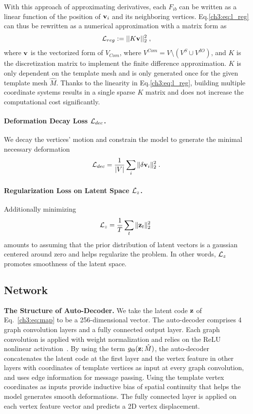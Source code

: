 With this approach of approximating derivatives, each $F_{ib}$ can be written as a linear function of the position of $\mathbf{v}_i$ and its neighboring vertices. Eq.\ref{ch3:eq:l_reg} can thus be rewritten as a numerical approximation with a matrix form as
\begin{equation}
    \mathcal{L}_{reg} := ||K\mathbf{v}||_2^2\;,
    \label{ch3:eq:discrete_euler_lagrange}
\end{equation}
where $\mathbf{v}$ is the vectorized form of $V_{Com}$, where $V^{Com}=V \setminus  ({V^S \cup V^{IO}})$, and $K$ is the discretization matrix to implement the finite difference approximation.
$K$ is only dependent on the template mesh and is only generated once for the given template mesh $\hat{M}$.
Thanks to the linearity in Eq.\ref{ch3:eq:l_reg}, building multiple coordinate systems results in a single sparse $K$ matrix and does not increase the computational cost significantly.

\paragraph{Deformation Decay Loss $\mathcal{L}_{dec}$.} 

We decay the vertices' motion and constrain the model to generate the minimal necessary deformation
%
\begin{equation}
    \mathcal{L}_{dec} = \frac{1}{|V|} \sum_i \| \mathbf{\delta v}_i \|^2_2\;.
\end{equation}

\paragraph{Regularization Loss on Latent Space $\mathcal{L}_z$.} Additionally minimizing 
%
\begin{equation}
    \mathcal{L}_{z} = \frac{1}{T} \sum_t \| \mathbf{z}_t \|^2_2 \; 
\end{equation}
%
amounts to assuming that the prior distribution of latent vectors is a gaussian centered around zero and helps regularize the problem. In other words, $\mathcal{L}_z$ promotes smoothness of the latent space.

\subsection{Network}
\noindent \textbf{The Structure of Auto-Decoder.} 
We take the latent code $\mathbf{z}$ of Eq.~\ref{ch3:eq:map} to be a 256-dimensional vector. The auto-decoder comprises 4 graph convolution layers \cite{ai.Kipf2016} and a fully connected output layer. Each graph convolution is applied with weight normalization \cite{ai.Salimans2016b} and relies on the ReLU nonlinear activation~\cite{ai.Nair2010}.
By using the term $g_\Theta(\mathbf{z};\hat{M})$, the auto-decoder concatenates the latent code at the first layer and the vertex feature in other layers with coordinates of template vertices as input at every graph convolution, and uses edge information for message passing.
Using the template vertex coordinates as inputs provide inductive bias of spatial continuity that helps the model generates smooth deformations.
The fully connected layer is applied on each vertex feature vector and predicts a 2D vertex displacement. 

